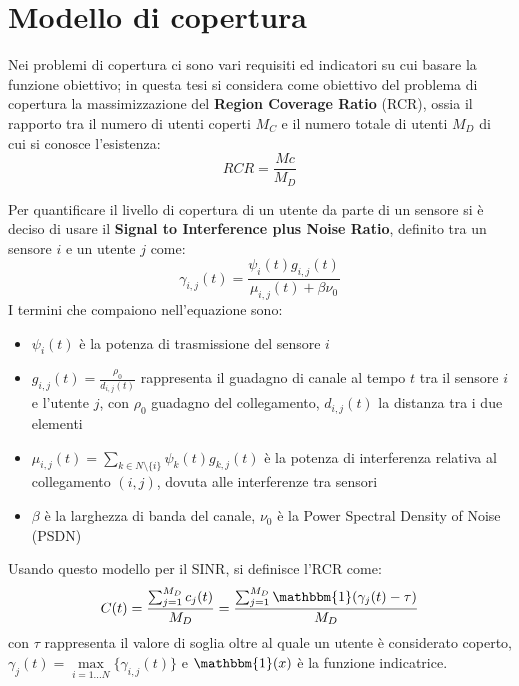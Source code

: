 \section{Modello di copertura} \label{sec:modello_copertura}

Nei problemi di copertura ci sono vari requisiti ed indicatori su cui basare la funzione obiettivo; in questa tesi si considera come obiettivo del problema di copertura la massimizzazione del \textbf{Region Coverage Ratio} (RCR), ossia il rapporto tra il numero di utenti coperti $M_C$ e il numero totale di utenti $M_D$ di cui si conosce l'esistenza:
\begin{equation}
    RCR = \frac{Mc}{M_D}
\end{equation}

Per quantificare il livello di copertura di un utente da parte di un sensore si è deciso di usare il \textbf{Signal to Interference plus Noise Ratio}, definito tra un sensore $i$ e un utente $j$ come:
\begin{equation}
    \gamma_{i,j}(t)=\frac{\psi_i(t)g_{i,j}(t)}{\mu_{i,j}(t)+\beta\nu_0}
\end{equation}
I termini che compaiono nell'equazione sono:
\begin{itemize}
    \item
        $\psi_i(t)$ è la potenza di trasmissione del sensore $i$

    \item
        $g_{i,j}(t) = \frac{\rho_0}{d_{i,j}(t)}$ rappresenta il guadagno di canale al tempo $t$ tra il sensore $i$ e l'utente $j$, con $\rho_0$ guadagno del collegamento, $d_{i,j}(t)$ la distanza tra i due elementi 

    \item
        $\mu_{i,j}(t)=\sum_{k\in N\setminus\{i\}} \psi_k(t)g_{k,j}(t)$ è la potenza di interferenza relativa al collegamento $(i, j)$, dovuta alle interferenze tra sensori

    \item
        $\beta$ è la larghezza di banda del canale, $\nu_0$ è la Power Spectral Density of Noise (PSDN)
    
\end{itemize}

Usando questo modello per il SINR, si definisce l'RCR come:
\begin{equation}
    C(t) = \frac{\sum_{j=1}^{M_D}c_j(t)}{M_D} = \frac{\sum_{j=1}^{M_D}\mathbbm{1}(\gamma_j(t)-\tau)}{M_D}
\end{equation}
con $\tau$ rappresenta il valore di soglia oltre al quale un utente è considerato coperto, $\gamma_j(t)=\max\limits_{i=1...N}\{\gamma_{i,j}(t)\}$ e $\mathbbm{1}(x)$ è la funzione indicatrice.